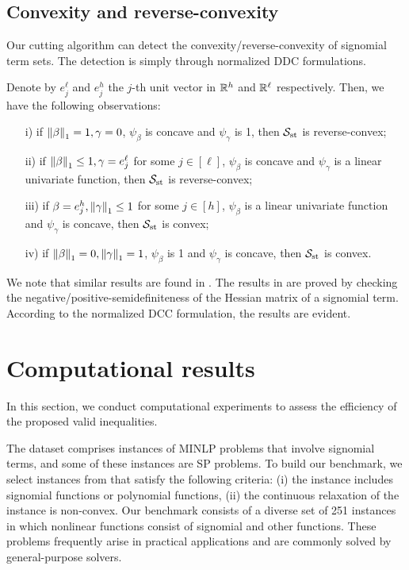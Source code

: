  \subsection{Convexity and reverse-convexity}
 \label{sec.conv}
Our cutting algorithm can detect the convexity/reverse-convexity of signomial term sets. The detection is simply through  normalized  DDC formulations.

Denote by $e^\ell_j$ and $e^h_j$ the $j$-th unit vector in $\mathbb R^h$ and $\mathbb R^\ell$ respectively. Then, we have the following observations:
\begin{enumerate}
	\item[i)] if ${\lVert\beta\rVert}_1 = 1,\gamma = 0$, \ie $\psi_{\beta}$ is concave and $\psi_{\gamma}$ is 1, then $\mathcal S_{\mathrm{st}}$ is reverse-convex;
	\item[ii)] if ${\lVert\beta\rVert}_1 \le 1,\gamma = e^\ell_j$ for some $j \in [\ell]$, \ie $\psi_{\beta}$ is concave and $\psi_{\gamma}$ is a linear univariate function, then $\mathcal S_{\mathrm{st}}$ is reverse-convex;
   \item[iii)] if $\beta = e^h_j, {\lVert\gamma\rVert}_1 \le 1$ for some $j \in [h]$, \ie
$\psi_{\beta}$ is a linear univariate function and $\psi_{\gamma}$ is concave, then  $\mathcal S_{\mathrm{st}}$ is convex;
   \item[iv)] if ${\lVert\beta\rVert}_1 = 0, {\lVert\gamma\rVert}_1 = 1$, \ie $\psi_{\beta}$ is 1  and $\psi_{\gamma}$ is concave, then $\mathcal S_{\mathrm{st}}$ is convex.
\end{enumerate}

We note that similar results are found in \cite{chen2009note,maranas1995finding}. The results in  \cite{chen2009note} are proved by checking the negative/positive-semidefiniteness of the Hessian matrix of a signomial term. According to the normalized DCC formulation, the results are evident.



\section{Computational results}
\label{sec.comp}


In this section, we conduct computational experiments to assess the efficiency of the proposed valid inequalities.



The \minlplib dataset comprises instances of MINLP problems that involve signomial terms, and some of these instances are SP problems. To build our benchmark, we select instances from \minlplib that satisfy the following criteria: (i) the instance includes signomial functions or polynomial functions, (ii) the continuous relaxation of the instance is non-convex. Our benchmark consists of a diverse set of 251 instances in which nonlinear functions consist of signomial and other functions. These problems frequently arise in practical applications and are commonly solved by general-purpose solvers.

